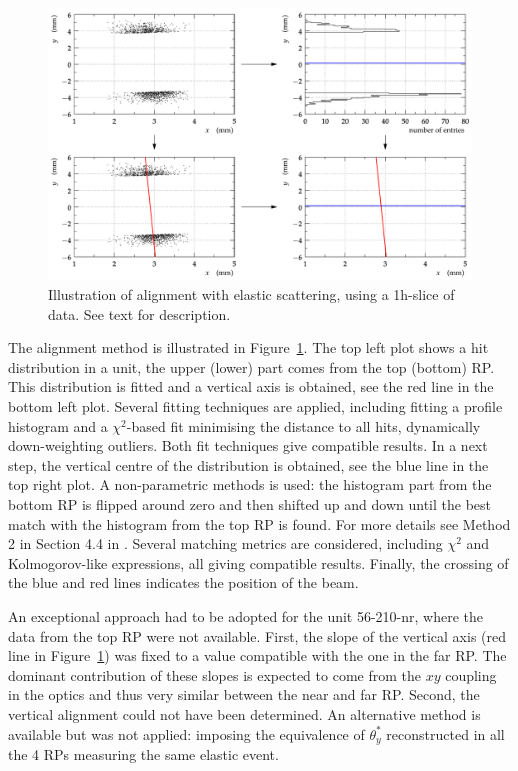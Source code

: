 \documentclass[TOTEM]{cern/cernphprep}
\begin{document}
\begin{figure}[h!]
\begin{center}
\includegraphics[width=1\hsize]{fig/calibration_fill/el_alignment_method.pdf}
\caption{%
Illustration of alignment with elastic scattering, using a 1h-slice of data. See text for description.
}
\label{fig:el_alignment_method}
\end{center}
\end{figure}

The alignment method is illustrated in Figure~\ref{fig:el_alignment_method}. The top left plot shows a hit distribution in a unit, the upper (lower) part comes from the top (bottom) RP. This distribution is fitted and a vertical axis is obtained, see the red line in the bottom left plot. Several fitting techniques are applied, including fitting a profile histogram and a $\chi^2$-based fit minimising the distance to all hits, dynamically down-weighting outliers. Both fit techniques give compatible results. In a next step, the vertical centre of the distribution is obtained, see the blue line in the top right plot. A non-parametric methods is used: the histogram part from the bottom RP is flipped around zero and then shifted up and down until the best match with the histogram from the top RP is found. For more details see Method 2 in Section 4.4 in \cite{jan_thesis}. Several matching metrics are considered, including $\chi^2$ and Kolmogorov-like expressions, all giving compatible results. Finally, the crossing of the blue and red lines indicates the position of the beam.


An exceptional approach had to be adopted for the unit 56-210-nr, where the data from the top RP were not available. First, the slope of the vertical axis (red line in Figure~\ref{fig:el_alignment_method}) was fixed to a value compatible with the one in the far RP. The dominant contribution of these slopes is expected to come from the $xy$ coupling in the optics and thus very similar between the near and far RP. Second, the vertical alignment could not have been determined. An alternative method is available but was not applied: imposing the equivalence of $\theta_y^*$ reconstructed in all the 4 RPs measuring the same elastic event.
\end{document}
